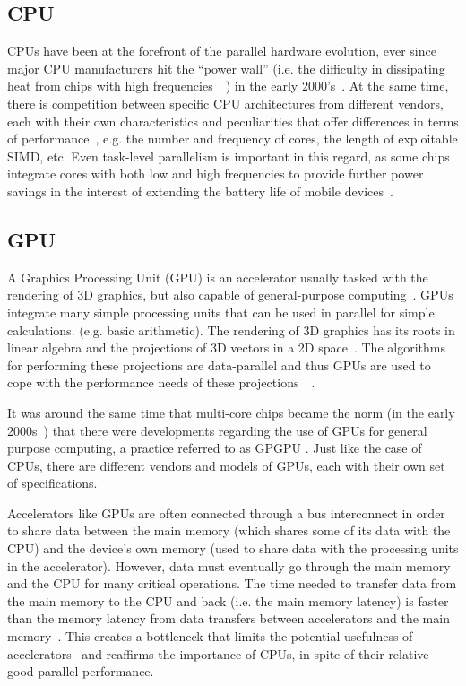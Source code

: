 \subsection{CPU}

CPUs have been at the forefront of the parallel hardware evolution, ever since major CPU manufacturers hit the ``power wall'' (i.e. the difficulty in dissipating heat from chips with high frequencies~\cite{flynn2005microprocessor}~\cite{2_sutter_2015}) in the early 2000's~\cite{flynn2005microprocessor}. At the same time, there is competition between specific CPU architectures from different vendors, each with their own characteristics and peculiarities that offer differences in terms of performance~\cite{Masoumzadeh2013}, e.g. the number and frequency of cores, the length of exploitable SIMD, etc. Even task-level parallelism is important in this regard, as some chips integrate cores with both low and high frequencies to provide further power savings in the interest of extending the battery life of mobile devices~\cite{zhu2013high}.

\subsection{GPU}

A Graphics Processing Unit (GPU) is an accelerator usually tasked with the rendering of 3D graphics, but also capable of general-purpose computing~\cite{Microsoft2013}. GPUs integrate many simple processing units that can be used in parallel for simple calculations. (e.g. basic arithmetic). The rendering of 3D graphics has its roots in linear algebra and the projections of 3D vectors in a 2D space~\cite{7_wikipedia_2015}. The algorithms for performing these projections are data-parallel and thus GPUs are used to cope with the performance needs of these projections~\cite{wu2011gpu}~\cite{8_wikipedia_2015}.

It was around the same time that multi-core chips became the norm (in the early 2000s~\cite{flynn2005microprocessor}) that there were developments regarding the use of GPUs for general purpose computing, a practice referred to as \gls{GPGPU} \cite{nickolls2010gpu}. Just like the case of CPUs, there are different vendors and models of GPUs, each with their own set of specifications.

Accelerators like GPUs are often connected through a bus interconnect in order to share data between the main memory (which shares some of its data with the CPU) and the device's own memory (used to share data with the processing units in the accelerator). However, data must eventually go through the main memory and the CPU for many critical operations. The time needed to transfer data from the main memory to the CPU and back (i.e. the main \gls{memory latency}) is faster than the memory latency from data transfers between accelerators and the main memory~\cite{daga2011efficacy}. This creates a bottleneck that limits the potential usefulness of accelerators~\cite{goddeke2007exploring} and reaffirms the importance of CPUs, in spite of their relative good parallel performance.

